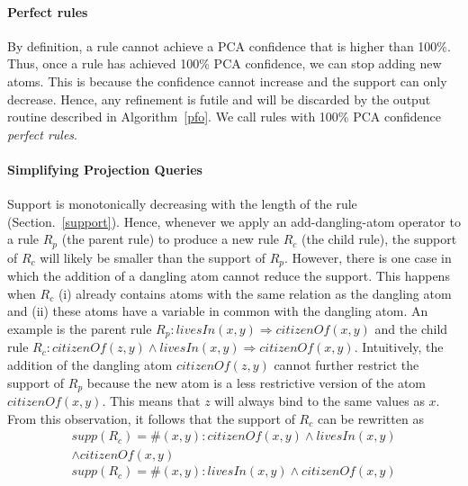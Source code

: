 \paragraph{Perfect rules}
By definition, a rule cannot achieve a PCA confidence that is higher than 100\%.
Thus, once a rule has achieved 100\% PCA confidence, we can stop adding new atoms.
This is because the confidence cannot increase and the support can only decrease.
Hence, any refinement is futile and will be discarded by the output routine described in
Algorithm~\ref{pfo}.
We call rules with 100\% PCA confidence \emph{perfect rules}.



\paragraph{Simplifying Projection Queries}
Support is monotonically decreasing with the length of the rule (Section.~\ref{support}). Hence, whenever we apply an add-dangling-atom operator to a rule $R_p$ (the parent rule) to produce
a new rule $R_c$ (the child rule), the support of $R_c$ will likely be smaller than the support of $R_p$.
However, there is one case in which the addition of a dangling atom cannot reduce the support.
This happens when $R_c$
(i) already contains atoms with the same relation as the dangling atom and
(ii) these atoms have a variable in common with the dangling atom.
An example is the parent rule $R_p:livesIn(x,y)\Rightarrow citizenOf(x,y)$ and the child rule
$R_c: citizenOf(z,y)\wedge livesIn(x,y)\Rightarrow citizenOf(x,y)$.
Intuitively, the addition of the dangling atom $\textit{citizenOf}(z,y)$ cannot further restrict the support of $R_p$ because
the new atom is a less restrictive version of the atom $citizenOf(x,y)$.
This means that $z$ will always bind to the same values as $x$.
From this observation, it follows that the support of $R_c$ can be rewritten as
\begin{multline*}
supp(R_c) = \#(x,y):  citizenOf(x,y)\wedge livesIn(x,y) \\ \wedge citizenOf(x,y)
\end{multline*}
\[
 supp(R_c) = \#(x,y):   livesIn(x,y)\wedge citizenOf(x,y)
\]

